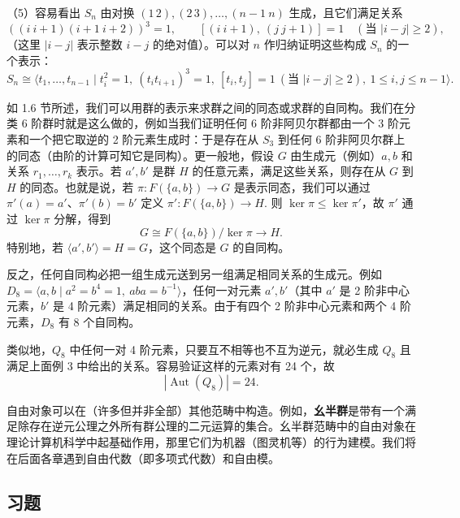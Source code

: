 \begin{example}
（5）容易看出 \(S_n\) 由对换 \((1\,2), (2\,3), \ldots, (n-1\ n)\) 生成，且它们满足关系
\[
((i\ i+1)(i+1\ i+2))^3 = 1, \qquad [(i\ i+1),\ (j\ j+1)] = 1 \quad (\text{当 } |i-j| \geq 2),
\]
（这里 \(|i-j|\) 表示整数 \(i-j\) 的绝对值）。可以对 \(n\) 作归纳证明这些构成 \(S_n\) 的一个表示：
\[
S_n \cong \langle t_1, \ldots, t_{n-1} \mid t_i^2 = 1,\ (t_it_{i+1})^3 = 1,\ [t_i, t_j] = 1\ (\text{当 } |i-j| \geq 2),\ 1 \leq i, j \leq n-1 \rangle.
\]
\end{example}

如 1.6 节所述，我们可以用群的表示来求群之间的同态或求群的自同构。我们在分类 6 阶群时就是这么做的，例如当我们证明任何 6 阶非阿贝尔群都由一个 3 阶元素和一个把它取逆的 2 阶元素生成时：于是存在从 \(S_3\) 到任何 6 阶非阿贝尔群上的同态（由阶的计算可知它是同构）。更一般地，假设 \(G\) 由生成元（例如）\(a, b\) 和关系 \(r_1, \ldots, r_k\) 表示。若 \(a', b'\) 是群 \(H\) 的任意元素，满足这些关系，则存在从 \(G\) 到 \(H\) 的同态。也就是说，若 \(\pi : F(\{a, b\}) \to G\) 是表示同态，我们可以通过 \(\pi'(a) = a'\)、\(\pi'(b) = b'\) 定义 \(\pi' : F(\{a, b\}) \to H\). 则 \(\ker \pi \leq \ker \pi'\)，故 \(\pi'\) 通过 \(\ker \pi\) 分解，得到
\[
G \cong F(\{a, b\})/\ker \pi \to H.
\]
特别地，若 \(\langle a', b' \rangle = H = G\)，这个同态是 \(G\) 的自同构。

反之，任何自同构必把一组生成元送到另一组满足相同关系的生成元。例如 \(D_8 = \langle a, b \mid a^2 = b^4 = 1,\ aba = b^{-1} \rangle\)，任何一对元素 \(a', b'\)（其中 \(a'\) 是 2 阶非中心元素，\(b'\) 是 4 阶元素）满足相同的关系。由于有四个 2 阶非中心元素和两个 4 阶元素，\(D_8\) 有 8 个自同构。

类似地，\(Q_8\) 中任何一对 4 阶元素，只要互不相等也不互为逆元，就必生成 \(Q_8\) 且满足上面例 3 中给出的关系。容易验证这样的元素对有 24 个，故
\[
|\operatorname{Aut}(Q_8)| = 24.
\]

自由对象可以在（许多但并非全部）其他范畴中构造。例如，\textbf{幺半群}是带有一个满足除存在逆元公理之外所有群公理的二元运算的集合。幺半群范畴中的自由对象在理论计算机科学中起基础作用，那里它们为机器（图灵机等）的行为建模。我们将在后面各章遇到自由代数（即多项式代数）和自由模。

\subsection*{习题}


